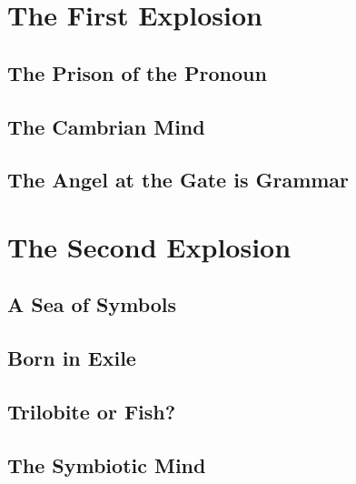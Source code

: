 \documentclass[12pt,letterpaper]{book}
\begin{document}
\part{The First Explosion}





\chapter{The Prison of the Pronoun}

\chapter{The Cambrian Mind}

\chapter{The Angel at the Gate is Grammar}

\part{The Second Explosion}

\chapter{A Sea of Symbols}

\chapter{Born in Exile}

\chapter{Trilobite or Fish?}



\chapter{The Symbiotic Mind}

\backmatter



\printbibliography
\end{document}
